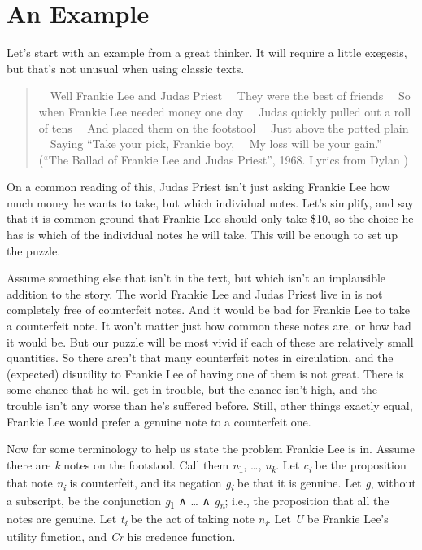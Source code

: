 \documentclass[
  11pt,
]{book}
\begin{document}
\hypertarget{frankielee}{%
\section{An Example}\label{frankielee}}

Let's start with an example from a great thinker. It will require a little exegesis, but that's not unusual when using classic texts.

\begin{quote}
~\textbar~Well Frankie Lee and Judas Priest
~\textbar~They were the best of friends
~\textbar~So when Frankie Lee needed money one day
~\textbar~Judas quickly pulled out a roll of tens
~\textbar~And placed them on the footstool
~\textbar~Just above the potted plain
~\textbar~Saying ``Take your pick, Frankie boy,
~\textbar~My loss will be your gain.''
~\textbar~ (``The Ballad of Frankie Lee and Judas Priest'', 1968. Lyrics from Dylan \citeyearpar[ 225]{Dylan2016})
\end{quote}

On a common reading of this, Judas Priest isn't just asking Frankie Lee how much money he wants to take, but which individual notes. Let's simplify, and say that it is common ground that Frankie Lee should only take \$10, so the choice he has is which of the individual notes he will take. This will be enough to set up the puzzle.

Assume something else that isn't in the text, but which isn't an implausible addition to the story. The world Frankie Lee and Judas Priest live in is not completely free of counterfeit notes. And it would be bad for Frankie Lee to take a counterfeit note. It won't matter just how common these notes are, or how bad it would be. But our puzzle will be most vivid if each of these are relatively small quantities. So there aren't that many counterfeit notes in circulation, and the (expected) disutility to Frankie Lee of having one of them is not great. There is some chance that he will get in trouble, but the chance isn't high, and the trouble isn't any worse than he's suffered before. Still, other things exactly equal, Frankie Lee would prefer a genuine note to a counterfeit one.

Now for some terminology to help us state the problem Frankie Lee is in. Assume there are \emph{k} notes on the footstool. Call them \emph{n}\textsubscript{1}, \ldots, \emph{n\textsubscript{k}}. Let \emph{c\textsubscript{i}} be the proposition that note \emph{n\textsubscript{i}} is counterfeit, and its negation \emph{g\textsubscript{i}} be that it is genuine. Let \emph{g}, without a subscript, be the conjunction \emph{g}\textsubscript{1} ∧ \ldots{} ∧ \emph{g\textsubscript{n}}; i.e., the proposition that all the notes are genuine. Let \emph{t\textsubscript{i}} be the act of taking note \emph{n\textsubscript{i}}. Let \emph{U} be Frankie Lee's utility function, and \emph{Cr} his credence function.
\end{document}

